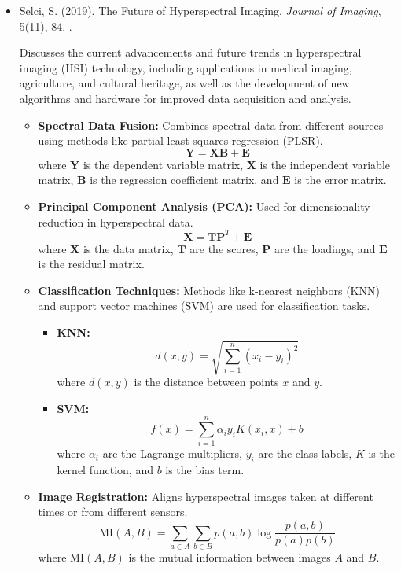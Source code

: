 \documentclass[10pt,svgnames,fragile]{beamer}
\begin{document}
\begin{frame}{}
\tiny
\begin{itemize}

    \item Selci, S. (2019). The Future of Hyperspectral Imaging. \textit{Journal of Imaging}, 5(11), 84. \href{https://doi.org/10.3390/jimaging5110084}{\color{blue}{DOI: 10.3390/jimaging5110084}}.
    \cite{selciFutureHyperspectralImaging2019}
    
    {\color{gray}Discusses the current advancements and future trends in hyperspectral imaging (HSI) technology, including applications in medical imaging, agriculture, and cultural heritage, as well as the development of new algorithms and hardware for improved data acquisition and analysis.}
    \begin{itemize} \tiny
    \item \textbf{Spectral Data Fusion:} Combines spectral data from different sources using methods like partial least squares regression (PLSR).
    \[
    \mathbf{Y} = \mathbf{X}\mathbf{B} + \mathbf{E}
    \]
    where \(\mathbf{Y}\) is the dependent variable matrix, \(\mathbf{X}\) is the independent variable matrix, \(\mathbf{B}\) is the regression coefficient matrix, and \(\mathbf{E}\) is the error matrix.
    \item \textbf{Principal Component Analysis (PCA):} Used for dimensionality reduction in hyperspectral data.
    \[
    \mathbf{X} = \mathbf{TP}^T + \mathbf{E}
    \]
    where \(\mathbf{X}\) is the data matrix, \(\mathbf{T}\) are the scores, \(\mathbf{P}\) are the loadings, and \(\mathbf{E}\) is the residual matrix.
    \item \textbf{Classification Techniques:} Methods like k-nearest neighbors (KNN) and support vector machines (SVM) are used for classification tasks.
    \begin{itemize} \tiny
        \item \textbf{KNN:}
        \[
        d(x, y) = \sqrt{\sum_{i=1}^{n} (x_i - y_i)^2}
        \]
        where \(d(x, y)\) is the distance between points \(x\) and \(y\).
        \item \textbf{SVM:}
        \[
        f(x) = \sum_{i=1}^{n} \alpha_i y_i K(x_i, x) + b
        \]
        where \(\alpha_i\) are the Lagrange multipliers, \(y_i\) are the class labels, \(K\) is the kernel function, and \(b\) is the bias term.
    \end{itemize}
    \item \textbf{Image Registration:} Aligns hyperspectral images taken at different times or from different sensors.
    \[
    \text{MI}(A, B) = \sum_{a \in A} \sum_{b \in B} p(a, b) \log \frac{p(a, b)}{p(a)p(b)}
    \]
    where \(\text{MI}(A, B)\) is the mutual information between images \(A\) and \(B\).
\end{itemize}

\end{itemize}
\end{frame}
\end{document}
